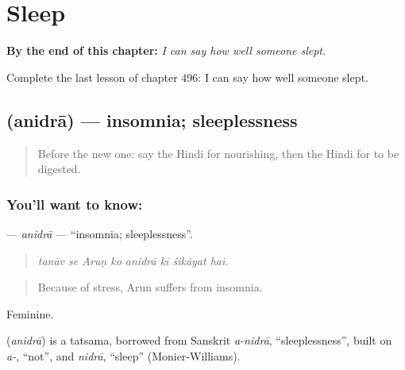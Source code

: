 
\chapter{Sleep}
\label{ch:hi-sleep}

\begin{chapteropening}
\textbf{By the end of this chapter:} \emph{I can say how well someone slept.}

Complete the last lesson of chapter 496: I can say how well someone slept.
\end{chapteropening}

\section[\texorpdfstring{\hi{अनिद्रा} (anidrā)}{अनिद्रा (anidrā)}]{ (anidrā) — insomnia; sleeplessness}

\label{lesson:HI-C496-anidra}



\begin{quote}
Before the new one: say the Hindi for nourishing, then the Hindi for to be digested.
\end{quote}

\subsection*{You'll want to know: }
\textbf{} — \emph{anidrā} — \textquotedblleft{}insomnia; sleeplessness\textquotedblright{}.

\begin{quote}
       
\end{quote}

\begin{quote}
\emph{tanāv se Aruṇ ko anidrā kī śikāyat hai.}
\end{quote}

\begin{quote}
Because of stress, Arun suffers from insomnia.
\end{quote}

Feminine.

\begin{cousinweb}
\textbf{} (\emph{anidrā}) is a tatsama, borrowed from Sanskrit \emph{a-nidrā}, \textquotedblleft{}sleeplessness\textquotedblright{}, built on \emph{a-}, \textquotedblleft{}not\textquotedblright{}, and \emph{nidrā}, \textquotedblleft{}sleep\textquotedblright{} (Monier-Williams).
\end{cousinweb}

